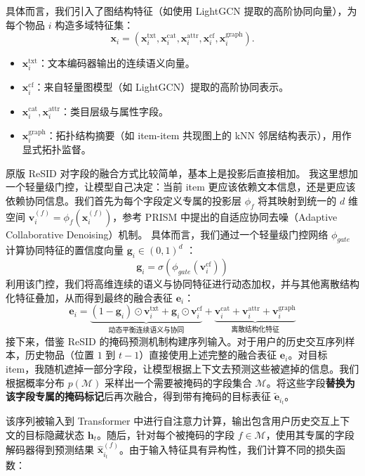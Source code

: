\documentclass[11pt]{article}
\begin{document}
具体而言，我们引入了图结构特征（如使用 LightGCN \cite{he2020lightgcn} 提取的高阶协同向量），为每个物品 $i$ 构造多域特征集：
$$\mathbf x_i = (\mathbf x_i^{\text{txt}},\mathbf x_i^{\text{cat}},\mathbf x_i^{\text{attr}},\mathbf x_i^{\text{cf}},\mathbf x_i^{\text{graph}}).$$
\begin{itemize}
  \item $\mathbf x_i^{\text{txt}}$：文本编码器输出的连续语义向量。
  \item $\mathbf x_i^{\text{cf}}$：来自轻量图模型（如 LightGCN）提取的高阶协同表示。
  \item $\mathbf x_i^{\text{cat}},\mathbf x_i^{\text{attr}}$：类目层级与属性字段。
  \item $\mathbf x_i^{\text{graph}}$：拓扑结构摘要（如 item-item 共现图上的 kNN 邻居结构表示），用作显式拓扑监督。
\end{itemize}

原版 ReSID 对字段的融合方式比较简单，基本上是投影后直接相加。  
我这里想加一个轻量级门控，让模型自己决定：当前 item 更应该依赖文本信息，还是更应该依赖协同信息。我们首先为每个字段定义专属的投影层 $\phi_f$ 将其映射到统一的 $d$ 维空间 $\mathbf{v}_i^{(f)} = \phi_f(\mathbf{x}_i^{(f)})$，参考 PRISM \cite{fang2026prism} 中提出的自适应协同去噪（Adaptive Collaborative Denoising）机制。
具体而言，我们通过一个轻量级门控网络 $\phi_{gate}$ 计算协同特征的置信度向量 $\mathbf{g}_i \in (0, 1)^d$ ：
$$\mathbf{g}_i = \sigma(\phi_{gate}(\mathbf{v}_i^{\text{cf}}))$$
利用该门控，我们将高维连续的语义与协同特征进行动态加权，并与其他离散结构化特征叠加，从而得到最终的融合表征 $\mathbf{e}_i$：
$$\mathbf{e}_i = \underbrace{(1 - \mathbf{g}_i) \odot \mathbf{v}_i^{\text{txt}} + \mathbf{g}_i \odot \mathbf{v}_i^{\text{cf}}}_{\text{动态平衡连续语义与协同}} + \underbrace{\mathbf{v}_i^{\text{cat}} + \mathbf{v}_i^{\text{attr}} + \mathbf{v}_i^{\text{graph}}}_{\text{离散结构化特征}}$$
接下来，借鉴 ReSID \cite{liang2026resid} 的掩码预测机制构建序列输入。对于用户的历史交互序列样本，历史物品（位置 $1$ 到 $t-1$）直接使用上述完整的融合表征 $\mathbf e_i$。对目标 item，我随机遮掉一部分字段，让模型根据上下文去预测这些被遮掉的信息。我们根据概率分布 $p(\mathcal{M})$ 采样出一个需要被掩码的字段集合 $\mathcal{M}$。将这些字段\textbf{替换为该字段专属的掩码标记}后再次融合，得到带有掩码的目标表征 $\tilde{\mathbf e}_{i_t}$。

该序列被输入到 Transformer 中进行自注意力计算，输出包含用户历史交互上下文的目标隐藏状态 $\mathbf{h}_t$。随后，针对每个被掩码的字段 $f \in \mathcal{M}$，使用其专属的字段解码器得到预测结果 $\hat{\mathbf{x}}_{i_t}^{(f)}$。由于输入特征具有异构性，我们计算不同的损失函数：
\end{document}
